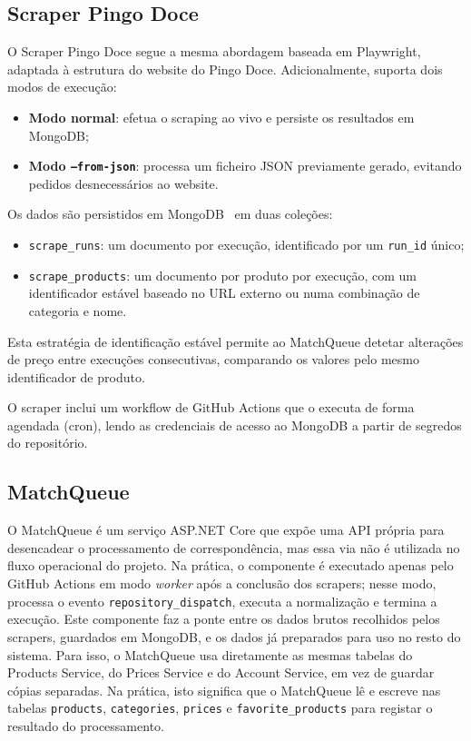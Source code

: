 \subsection{Scraper Pingo Doce}
\label{sec:4.3.3}

O Scraper Pingo Doce segue a mesma abordagem baseada em Playwright, adaptada à estrutura do website do Pingo Doce. Adicionalmente, suporta dois modos de execução:

\begin{itemize}
    \item \textbf{Modo normal}: efetua o scraping ao vivo e persiste os resultados em MongoDB;
    \item \textbf{Modo \texttt{--from-json}}: processa um ficheiro JSON previamente gerado, evitando pedidos desnecessários ao website.
\end{itemize}

Os dados são persistidos em MongoDB~\cite{mongodb-docs} em duas coleções:
\begin{itemize}
    \item \texttt{scrape\_runs}: um documento por execução, identificado por um \texttt{run\_id} único;
    \item \texttt{scrape\_products}: um documento por produto por execução, com um identificador estável baseado no URL externo ou numa combinação de categoria e nome.
\end{itemize}

Esta estratégia de identificação estável permite ao MatchQueue detetar alterações de preço entre execuções consecutivas, comparando os valores pelo mesmo identificador de produto.

O scraper inclui um workflow de GitHub Actions que o executa de forma agendada (cron), lendo as credenciais de acesso ao MongoDB a partir de segredos do repositório.

\subsection{MatchQueue}
\label{sec:4.3.4}

O MatchQueue é um serviço ASP.NET Core que expõe uma API própria para desencadear o processamento de correspondência, mas essa via não é utilizada no fluxo operacional do projeto. Na prática, o componente é executado apenas pelo GitHub Actions em modo \textit{worker} após a conclusão dos scrapers; nesse modo, processa o evento \texttt{repository\_dispatch}, executa a normalização e termina a execução.
Este componente faz a ponte entre os dados brutos recolhidos pelos scrapers, guardados em MongoDB, e os dados já preparados para uso no resto do sistema. Para isso, o MatchQueue usa diretamente as mesmas tabelas do Products Service, do Prices Service e do Account Service, em vez de guardar cópias separadas. Na prática, isto significa que o MatchQueue lê e escreve nas tabelas \texttt{products}, \texttt{categories}, \texttt{prices} e \texttt{favorite\_products} para registar o resultado do processamento.

